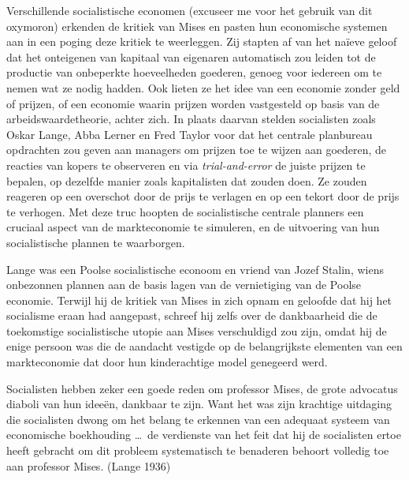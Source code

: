\documentclass[
  a5paper,
  smalldemyvopaper,11pt,twoside,onecolumn,openright,extrafontsizes,
hidelinks]{memoir}
\begin{document}
Verschillende socialistische economen (excuseer me voor het gebruik van
dit oxymoron) erkenden de kritiek van Mises en pasten hun economische
systemen aan in een poging deze kritiek te weerleggen. Zij stapten af
van het naïeve geloof dat het onteigenen van kapitaal van eigenaren
automatisch zou leiden tot de productie van onbeperkte hoeveelheden
goederen, genoeg voor iedereen om te nemen wat ze nodig hadden. Ook
lieten ze het idee van een economie zonder geld of prijzen, of een
economie waarin prijzen worden vastgesteld op basis van de
arbeidswaardetheorie, achter zich. In plaats daarvan stelden socialisten
zoals Oskar Lange, Abba Lerner en Fred Taylor voor dat het centrale
planbureau opdrachten zou geven aan managers om prijzen toe te wijzen
aan goederen, de reacties van kopers te observeren en via
\emph{trial-and-error} de juiste prijzen te bepalen, op dezelfde manier
zoals kapitalisten dat zouden doen. Ze zouden reageren op een overschot
door de prijs te verlagen en op een tekort door de prijs te verhogen.
Met deze truc hoopten de socialistische centrale planners een cruciaal
aspect van de markteconomie te simuleren, en de uitvoering van hun
socialistische plannen te waarborgen.

Lange was een Poolse socialistische econoom en vriend van Jozef Stalin,
wiens onbezonnen plannen aan de basis lagen van de vernietiging van de
Poolse economie. Terwijl hij de kritiek van Mises in zich opnam en
geloofde dat hij het socialisme eraan had aangepast, schreef hij zelfs
over de dankbaarheid die de toekomstige socialistische utopie aan Mises
verschuldigd zou zijn, omdat hij de enige persoon was die de aandacht
vestigde op de belangrijkste elementen van een markteconomie dat door
hun kinderachtige model genegeerd werd.

Socialisten hebben zeker een goede reden om professor Mises, de grote
advocatus diaboli van hun ideeën, dankbaar te zijn. Want het was zijn
krachtige uitdaging die socialisten dwong om het belang te erkennen van
een adequaat systeem van economische boekhouding \ldots~de verdienste
van het feit dat hij de socialisten ertoe heeft gebracht om dit probleem
systematisch te benaderen behoort volledig toe aan professor Mises.
(Lange 1936)
\end{document}
